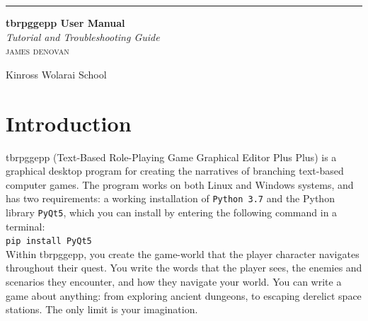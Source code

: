 \documentclass{article} \usepackage[margin=1in,headheight=57pt,headsep=0.1in]{geometry}
\begin{document}
\begin{titlepage} %

	\raggedleft %

	\rule{1pt}{\textheight} %
	\hspace{0.05\textwidth} %
	\parbox[b]{0.75\textwidth}{ %

		{\Huge\bfseries tbrpggepp User Manual}\\[2\baselineskip] %
		{\large\textit{Tutorial and Troubleshooting Guide}}\\[4\baselineskip] %
		{\Large\textsc{james denovan}} %

		\vspace{0.5\textheight} %

		{\noindent Kinross Wolarai School}\\[\baselineskip] %
	}

\end{titlepage}
\thispagestyle{empty}
\tableofcontents
\pagebreak
\pagestyle{fancy}
\section{Introduction}
tbrpggepp (Text-Based Role-Playing Game Graphical Editor Plus Plus) is a graphical desktop program for creating the narratives of branching text-based computer games. The program works on both Linux and Windows systems, and has two requirements: a working installation of \texttt{Python 3.7} and the Python library \texttt{PyQt5}, which you can install by entering the following command in a terminal: \\

\texttt{pip install PyQt5} \\

Within tbrpggepp, you create the game-world that the player character navigates throughout their quest. You write the words that the player sees, the enemies and scenarios they encounter, and how they navigate your world. You can write a game about anything: from exploring ancient dungeons, to escaping derelict space stations. The only limit is your imagination. \\
\end{document}

